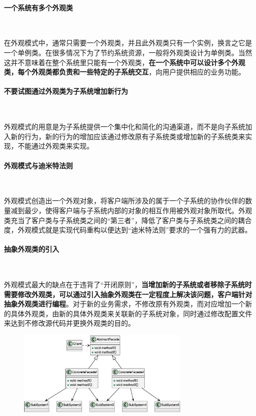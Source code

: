 \paragraph*{一个系统有多个外观类}~{} \par
在外观模式中，通常只需要一个外观类，并且此外观类只有一个实例，换言之它是一个单例类。在很多情况下为了节约系统资源，一般将外观类设计为单例类。当然这并不意味着在整个系统里只能有一个外观类，\textbf{在一个系统中可以设计多个外观类，每个外观类都负责和一些特定的子系统交互}，向用户提供相应的业务功能。

\paragraph*{不要试图通过外观类为子系统增加新行为}~{} \par
外观模式的用意是为子系统提供一个集中化和简化的沟通渠道，而不是向子系统加入新的行为，新的行为的增加应该通过修改原有子系统类或增加新的子系统类来实现，不能通过外观类来实现。

\paragraph*{外观模式与迪米特法则}~{} \par
外观模式创造出一个外观对象，将客户端所涉及的属于一个子系统的协作伙伴的数量减到最少，使得客户端与子系统内部的对象的相互作用被外观对象所取代。外观类充当了客户类与子系统类之间的“第三者”，降低了客户类与子系统类之间的耦合度，外观模式就是实现代码重构以便达到“迪米特法则”要求的一个强有力的武器。

\paragraph*{抽象外观类的引入}~{} \par
外观模式最大的缺点在于违背了“开闭原则”，\textbf{当增加新的子系统或者移除子系统时需要修改外观类，可以通过引入抽象外观类在一定程度上解决该问题，客户端针对抽象外观类进行编程}。对于新的业务需求，不修改原有外观类，而对应增加一个新的具体外观类，由新的具体外观类来关联新的子系统对象，同时通过修改配置文件来达到不修改源代码并更换外观类的目的。
\begin{figure}[H]
    \vspace{-0.5em}
	\centering
	\includegraphics[width=0.75\textwidth]{images/抽象外观类的引入.eps}
    \vspace{-1em}
\end{figure}


